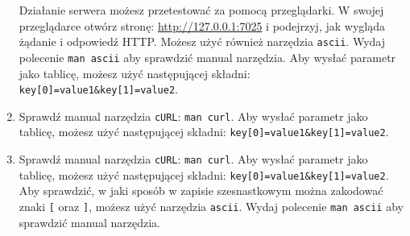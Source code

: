 \begin{enumerate}[label=\textbf{7.\arabic*}]
\noindent Działanie serwera możesz przetestować za pomocą przeglądarki. W swojej przeglądarce otwórz stronę: \url{http://127.0.0.1:7025} i podejrzyj, jak wygląda żądanie i odpowiedź HTTP. Możesz użyć również narzędzia \texttt{ascii}. Wydaj polecenie \texttt{man ascii} aby sprawdzić manual narzędzia.  Aby wysłać parametr jako tablicę, możesz użyć następującej składni:  \texttt{key[0]=value1\&key[1]=value2}.

\item Sprawdź manual narzędzia \texttt{cURL}: \texttt{man curl}. Aby wysłać parametr jako tablicę, możesz użyć następującej składni:  \texttt{key[0]=value1\&key[1]=value2}.
\item Sprawdź manual narzędzia \texttt{cURL}: \texttt{man curl}. Aby wysłać parametr jako tablicę, możesz użyć następującej składni:  \texttt{key[0]=value1\&key[1]=value2}. Aby sprawdzić,  w jaki sposób w zapisie szesnastkowym można zakodować znaki \texttt{[} oraz \texttt{]}, możesz użyć narzędzia \texttt{ascii}. Wydaj polecenie \texttt{man ascii} aby sprawdzić manual narzędzia.
 


\end{enumerate}

